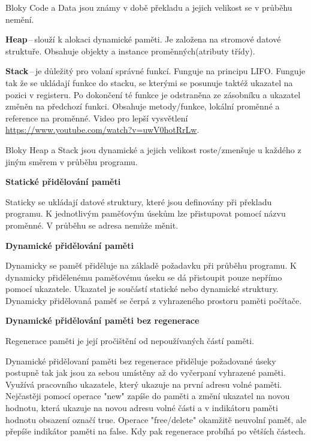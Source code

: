  Bloky Code a Data jsou známy v době překladu a jejich velikost se v průběhu nemění.

\textbf{Heap}\,--\,slouží k alokaci dynamické paměti. Je založena na stromové datové struktuře. Obsahuje objekty a instance proměnných(atributy třídy).

\textbf{Stack}\,--\,je důležitý pro volaní správné funkcí. Funguje na principu LIFO. Funguje tak že se ukládají funkce do stacku, se kterými se posunuje taktéž ukazatel na pozici v registeru. Po dokončení té funkce je odstraněna ze zásobníku a ukazatel změněn na předchozí funkci. Obsahuje metody/funkce, lokální proměnné a reference na proměnné. Video pro lepší vysvětlení \url{https://www.youtube.com/watch?v=uwV0hotRrLw}.

 Bloky Heap a Stack jsou dynamické a jejich velikost roste/zmenšuje u každého z jiným směrem v průběhu programu.

\begin{Large}\vspace{0,5cm} \textbf{Statické přidělování paměti}
\end{Large}

 Staticky se ukládají datové struktury, které jsou definovány při překladu programu. K jednotlivým paměťovým úsekům lze přistupovat pomocí názvu proměnné. V průběhu se adresa nemůže měnit.

\begin{Large}\vspace{0,5cm} \textbf{Dynamické přidělování paměti}
\end{Large}

 Dynamicky se paměť přiděluje na základě požadavku při průběhu programu. K dynamicky přidělenému paměťovému úseku se dá přistoupit pouze nepřímo pomocí ukazatele. Ukazatel je součástí statické nebo dynamické struktury. Dynamicky přidělovaná paměť se čerpá z vyhrazeného prostoru paměti počítače.

\begin{Large}\vspace{0,5cm} \textbf{Dynamické přidělování paměti bez regenerace}
\end{Large}

 Regenerace paměti je její pročištění od nepoužívaných částí paměti.

 Dynamické přidělovaní paměti bez regenerace přiděluje požadované úseky postupně tak jak jsou za sebou umístěny až do vyčerpaní vyhrazené paměti. Využívá pracovního ukazatele, který ukazuje na první adresu volné paměti. Nejčastěji pomocí operace "new" zapíše do paměti a změní ukazatel na novou hodnotu, která ukazuje na novou adresu volné části a v indikátoru paměti hodnotu obsazení označí true. Operace "free/delete" okamžitě neuvolní paměť, ale přepíše indikátor paměti na false. Kdy pak regenerace probíhá po větších částech. 


